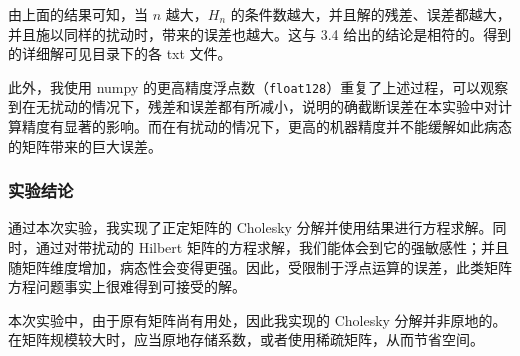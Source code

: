 \documentclass[11pt]{ctexart}
\begin{document}
    由上面的结果可知，当 \(n\) 越大，\(H_n\)
的条件数越大，并且解的残差、误差都越大，并且施以同样的扰动时，带来的误差也越大。这与
3.4 给出的结论是相符的。得到的详细解可见目录下的各 txt 文件。

此外，我使用 numpy 的更高精度浮点数（\texttt{float128}）重复了上述过程，可以观察到在无扰动的情况下，残差和误差都有所减小，说明的确截断误差在本实验中对计算精度有显著的影响。而在有扰动的情况下，更高的机器精度并不能缓解如此病态的矩阵带来的巨大误差。

    \subsubsection{实验结论}\label{ux5b9eux9a8cux7ed3ux8bba}

通过本次实验，我实现了正定矩阵的 Cholesky
分解并使用结果进行方程求解。同时，通过对带扰动的 Hilbert
矩阵的方程求解，我们能体会到它的强敏感性；并且随矩阵维度增加，病态性会变得更强。因此，受限制于浮点运算的误差，此类矩阵方程问题事实上很难得到可接受的解。

本次实验中，由于原有矩阵尚有用处，因此我实现的 Cholesky
分解并非原地的。在矩阵规模较大时，应当原地存储系数，或者使用稀疏矩阵，从而节省空间。


    
    
    
    
\end{document}
